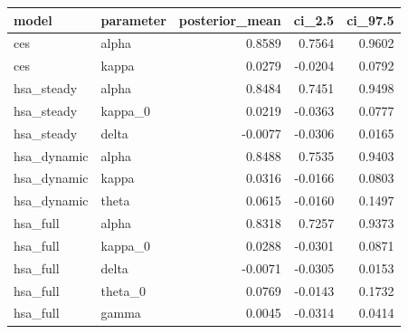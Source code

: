 \begin{tabular}{llrrr}
\toprule
model & parameter & posterior\_mean & ci\_2.5 & ci\_97.5 \\
\midrule
ces & alpha & 0.8589 & 0.7564 & 0.9602 \\
ces & kappa & 0.0279 & -0.0204 & 0.0792 \\
hsa\_steady & alpha & 0.8484 & 0.7451 & 0.9498 \\
hsa\_steady & kappa\_0 & 0.0219 & -0.0363 & 0.0777 \\
hsa\_steady & delta & -0.0077 & -0.0306 & 0.0165 \\
hsa\_dynamic & alpha & 0.8488 & 0.7535 & 0.9403 \\
hsa\_dynamic & kappa & 0.0316 & -0.0166 & 0.0803 \\
hsa\_dynamic & theta & 0.0615 & -0.0160 & 0.1497 \\
hsa\_full & alpha & 0.8318 & 0.7257 & 0.9373 \\
hsa\_full & kappa\_0 & 0.0288 & -0.0301 & 0.0871 \\
hsa\_full & delta & -0.0071 & -0.0305 & 0.0153 \\
hsa\_full & theta\_0 & 0.0769 & -0.0143 & 0.1732 \\
hsa\_full & gamma & 0.0045 & -0.0314 & 0.0414 \\
\bottomrule
\end{tabular}
